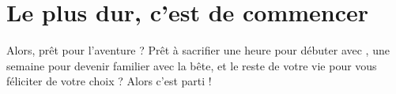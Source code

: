 \section{Le plus dur, c'est de commencer}

Alors, prêt pour l'aventure ? Prêt à sacrifier une heure pour débuter avec \vim, une semaine pour devenir familier avec la bête, et le reste de votre vie pour vous féliciter de votre choix ? Alors c'est parti !
